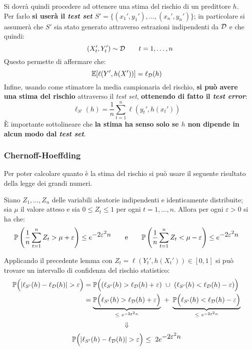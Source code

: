 Si dovrà quindi procedere ad ottenere una stima del rischio di un predittore $h$.
Per farlo 
\textbf{si userà il \textit{test set} $S'=\{(x_1',y_1'),\dots,(x_n',y_n')\}$};
in particolare si assumerà che $S'$ sia stato generato attraverso estrazioni 
indipendenti da $\mathcal{D}$ e che quindi:
\begin{equation}
    \quad (X_t',Y_t') \sim \mathcal{D} \tag*{$t=1,\dots,n$}
\end{equation}
Questo permette di affermare che:
$$ \mathbb{E}[\ell(Y',h(X'))] = \ell_{\mathcal{D}}(h) $$
Infine, usando come stimatore la media campionaria del rischio, \textbf{si può
avere una stima del rischio} attraverso il \textit{test set}, \textbf{ottenendo
di fatto il \textit{test error}}:
$$ \ell_{S'}(h) = \frac{1}{n}\sum_{t=1}^n \ell(y_t',h(x_t')) $$
È importante sottolineare che \textbf{la stima ha senso solo se $h$ non dipende
in alcun modo dal \textit{test set}}.

\subsubsection{Chernoff-Hoeffding}
Per poter calcolare quanto  è la stima del rischio si può usare
il seguente risultato della legge dei grandi numeri.

\begin{lemma}
    Siano $Z_1,\dots,Z_n$ delle variabili aleatorie indipendenti e
    identicamente distribuite; sia $\mu$ il valore atteso e sia $0\leq Z_t\leq1$
    per ogni $t=1,\dots,n$. Allora per ogni $\varepsilon>0$ si ha che:
    $$ \mathbb{P} \left(
        \frac{1}{n}\sum_{t=1}^n Z_t > \mu + \varepsilon
    \right) \leq e^{\displaystyle-2\varepsilon^2n}
    \qquad \text{e} \qquad
    \mathbb{P} \left(
        \frac{1}{n}\sum_{t=1}^n Z_t < \mu - \varepsilon
    \right) \leq e^{\displaystyle-2\varepsilon^2n} $$
\end{lemma}
\vspace{1em}

Applicando il precedente lemma con $Z_t = \ell(Y_t',h(X_t')) \in [0,1]$ si
può trovare un intervallo di confidenza del rischio statistico:
$$\begin{aligned}
    \Prob \Bigl( |\ell_{S'}(h) - \ell_\D(h)| > \varepsilon \Bigl) &= 
        \Prob\Bigl((\ell_{S'}(h) > \ell_\D(h)+\varepsilon) \ \cup \ 
        (\ell_{S'}(h) < \ell_\D(h)-\varepsilon) \Bigl)\\
    &= \underbrace{\Prob\Bigl(\ell_{S'}(h) > \ell_\D(h)+\varepsilon\Bigl)}
        _{\leq \ e^{-2\varepsilon^2n}} \ + \
       \underbrace{\Prob\Bigl(\ell_{S'}(h) < \ell_\D(h)-\varepsilon \Bigl)}
       _{\leq \ e^{-2\varepsilon^2n}}
\end{aligned}$$
$$ \Downarrow $$
$$ \mathbb{P} \Bigl( |\ell_{S'}(h) - \ell_{\mathcal{D}}(h)| > \varepsilon \Bigl) 
 \ \leq \ 2e^{\displaystyle-2\varepsilon^2n} $$

